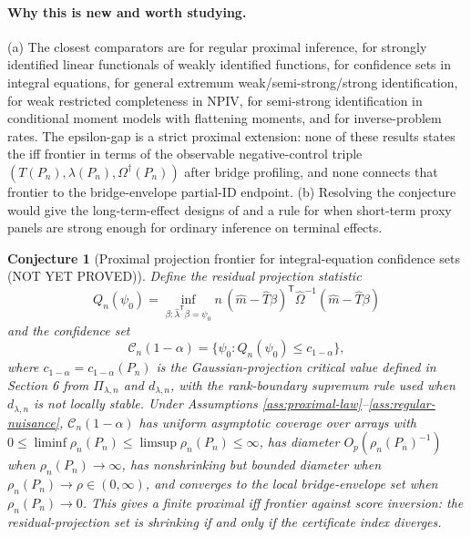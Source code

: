 \documentclass[11pt]{article}
\newcommand{\transpose}{\mathsf{T}}
\theoremstyle{definition}
\theoremstyle{plain}
\newtheorem{conjecture}{Conjecture}
\theoremstyle{remark}
\begin{document}
\paragraph{Why this is new and worth studying.}
(a) The closest comparators are \cite[Theorem 3.1]{CuiPuShiMiaoTchetgen2024}
for regular proximal inference,
\cite[Abstract and Section 2]{BennettKallusMaoNeweySyrgkanisUehara2023} for
strongly identified linear functionals of weakly identified functions,
\cite[Sections 2--3]{SmuclerRobinsRotnitzky2025} for confidence sets in
integral equations, \cite[Section 2]{AndrewsCheng2012} for general extremum
weak/semi-strong/strong identification, \cite[Section 2]{Freyberger2015} for
weak restricted completeness in NPIV,
\cite[Sections 2--3]{AntoineLavergne2014} for semi-strong identification in
conditional moment models with flattening moments, and
\cite[Theorems 2.1--2.2]{ChenReiss2011} for inverse-problem rates.  The
epsilon-gap is a strict proximal extension: none of these results states the
iff frontier in terms of the observable negative-control triple
$(T(P_n),\lambda(P_n),\Omega^\dagger(P_n))$ after bridge profiling, and none
connects that frontier to the bridge-envelope partial-ID endpoint.  (b)
Resolving the conjecture
would give the long-term-effect designs of \cite{AtheyChettyImbensKang2019}
and \cite{ImbensKallusMaoWang2025} a rule for when short-term proxy panels are
strong enough for ordinary inference on terminal effects.

\begin{conjecture}[Proximal projection frontier for integral-equation confidence sets (NOT YET PROVED)]\label{conj:projection}
Define the residual projection statistic
\[
Q_n(\psi_0)=
\inf_{\beta:\widehat\lambda^\transpose\beta=\psi_0}
n\,(\widehat m-\widehat T\beta)^\transpose
\widehat\Omega^{-1}(\widehat m-\widehat T\beta)
\]
and the confidence set
\[
\mathcal C_n(1-\alpha)=
\{\psi_0:Q_n(\psi_0)\le c_{1-\alpha}\},
\]
where $c_{1-\alpha}=c_{1-\alpha}(P_n)$ is the Gaussian-projection critical
value defined in Section 6 from $\Pi_{\lambda,n}$ and $d_{\lambda,n}$, with the
rank-boundary supremum rule used when $d_{\lambda,n}$ is not locally stable.
Under Assumptions \ref{ass:proximal-law}--\ref{ass:regular-nuisance},
$\mathcal C_n(1-\alpha)$ has uniform asymptotic coverage over arrays with
$0\le\liminf\rho_n(P_n)\le\limsup\rho_n(P_n)\le\infty$, has diameter
$O_p(\rho_n(P_n)^{-1})$ when $\rho_n(P_n)\to\infty$, has nonshrinking but
bounded diameter when $\rho_n(P_n)\to\rho\in(0,\infty)$, and converges to the
local bridge-envelope set when $\rho_n(P_n)\to0$.  This gives a finite
proximal iff frontier against score inversion: the residual-projection set is
shrinking if and only if the certificate index diverges.
\end{conjecture}
\end{document}
